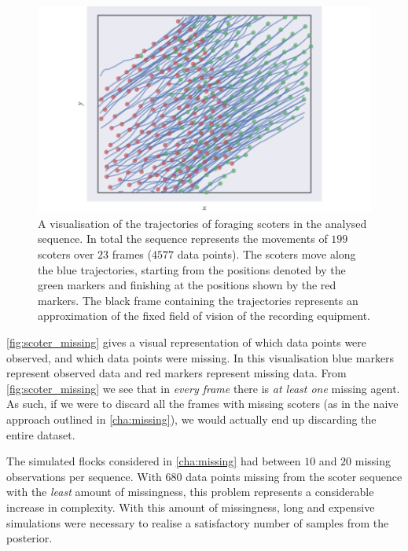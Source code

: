 \begin{figure}[tb]
  \includegraphics{data_00_traj.pdf}
  \caption{A visualisation of the trajectories of foraging scoters in the
      analysed sequence. In total the sequence represents the movements of
      $199$ scoters over $23$ frames ($4577$ data points). The scoters move
      along the blue trajectories, starting from the positions denoted by the
      green markers and finishing at the positions shown by the red markers.
      The black frame containing the trajectories represents an approximation
      of the fixed field of vision of the recording equipment.}
  \label{fig:scoter_traj}
\end{figure}

\cref{fig:scoter_missing} gives a visual representation of which data points
were observed, and which data points were missing. In this visualisation blue
markers represent observed data and red markers represent missing data. From
\cref{fig:scoter_missing} we see that in \emph{every frame} there is \emph{at
least one} missing agent. As such, if we were to discard all the frames with
missing scoters (as in the naive approach outlined in \cref{cha:missing}), we
would actually end up discarding the entire dataset.

The simulated flocks considered in \cref{cha:missing} had between $10$ and $20$
missing observations per sequence. With $680$ data points missing from the
scoter sequence with the \emph{least} amount of missingness, this problem
represents a considerable increase in complexity. With this amount of
missingness, long and expensive simulations were necessary to realise a
satisfactory number of samples from the posterior.

